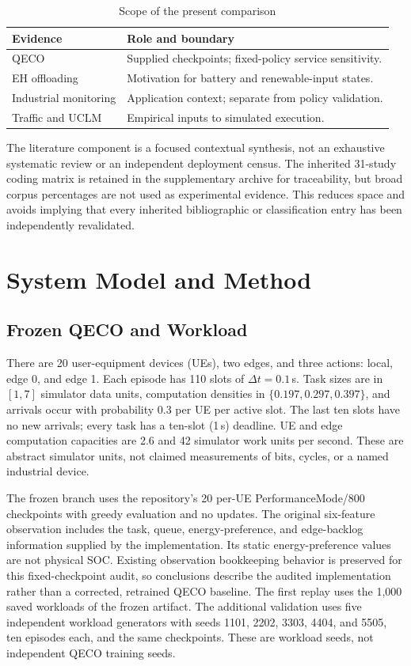 \documentclass[conference]{IEEEtran}
\begin{document}
\begin{table}[t]
\centering\small
\caption{Scope of the present comparison}
\label{tab:scope}
\begin{tabularx}{\columnwidth}{@{}lY@{}}\toprule
Evidence & Role and boundary\\\midrule
QECO \cite{QECO} & Supplied checkpoints; fixed-policy service sensitivity.\\
EH offloading \cite{Mao2016_s2,Min2017_s18,Mei2023_s23} & Motivation for battery and renewable-input states.\\
Industrial monitoring \cite{Singh2024_supp3,Mirani2024_supp7} & Application context; separate from policy validation.\\
Traffic \cite{Traffic} and UCLM \cite{UCLM,UCLMData} & Empirical inputs to simulated execution.\\\bottomrule
\end{tabularx}
\end{table}
The literature component is a focused contextual synthesis, not an exhaustive systematic review or an independent deployment census. The inherited 31-study coding matrix is retained in the supplementary archive for traceability, but broad corpus percentages are not used as experimental evidence. This reduces space and avoids implying that every inherited bibliographic or classification entry has been independently revalidated.

\section{System Model and Method}
\label{sec:method}
\subsection{Frozen QECO and Workload}
There are 20 user-equipment devices (UEs), two edges, and three actions: local, edge 0, and edge 1. Each episode has 110 slots of $\Delta t=0.1$\,s. Task sizes are in $[1,7]$ simulator data units, computation densities in $\{0.197,0.297,0.397\}$, and arrivals occur with probability 0.3 per UE per active slot. The last ten slots have no new arrivals; every task has a ten-slot (1\,s) deadline. UE and edge computation capacities are 2.6 and 42 simulator work units per second. These are abstract simulator units, not claimed measurements of bits, cycles, or a named industrial device.

The frozen branch uses the repository's 20 per-UE PerformanceMode/800 checkpoints with greedy evaluation and no updates. The original six-feature observation includes the task, queue, energy-preference, and edge-backlog information supplied by the implementation. Its static energy-preference values are not physical SOC. Existing observation bookkeeping behavior is preserved for this fixed-checkpoint audit, so conclusions describe the audited implementation rather than a corrected, retrained QECO baseline. The first replay uses the 1,000 saved workloads of the frozen artifact. The additional validation uses five independent workload generators with seeds 1101, 2202, 3303, 4404, and 5505, ten episodes each, and the same checkpoints. These are workload seeds, not independent QECO training seeds.
\end{document}
